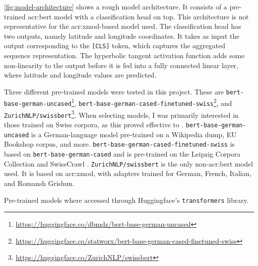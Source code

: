 \autoref{fig:model-architecture} shows a rough model architecture. It consists of a pre-trained \acrshort{acr:bert} model with a classification head on top. This architecture is not representative for the \acrshort{acr:xmod}-based model used. The classification head has two outputs, namely  latitude and longitude coordinates. It takes as input the output corresponding to the \texttt{[CLS]} token, which captures the aggregated sequence representation. The hyperbolic tangent activation function adds some non-linearity to the output before it is fed into a fully connected linear layer, where latitude and longitude values are predicted.

Three different pre-trained models were tested in this project. These are \texttt{bert-base-german-uncased}\footnote{\url{https://huggingface.co/dbmdz/bert-base-german-uncased}}, \texttt{bert-base-german-cased-finetuned-swiss}\footnote{\url{https://huggingface.co/statworx/bert-base-german-cased-finetuned-swiss}}, and \texttt{ZurichNLP/swissbert}\footnote{\url{https://huggingface.co/ZurichNLP/swissbert}}. When selecting models, I was primarily interested in those trained on Swiss corpora, as this proved effective to \cite{scherrerHeLjuVarDial20202020}. \texttt{bert-base-german-uncased} is a German-language model pre-trained on a Wikipedia dump, EU Bookshop corpus, and more. \texttt{bert-base-german-cased-finetuned-swiss} is based on \texttt{bert-base-german-cased} and is pre-trained on the Leipzig Corpora Collection \citep{goldhahnBuildingLargeMonolingual} and SwissCrawl \citep{linderAutomaticCreationText2020}. \texttt{ZurichNLP/swissbert} is the only non-\acrshort{acr:bert} model used. It is based on \acrshort{acr:xmod}, with adapters trained for German, French, Italian, and Romansh Grishun.

Pre-trained models where accessed through Huggingface's \texttt{transformers} library.


